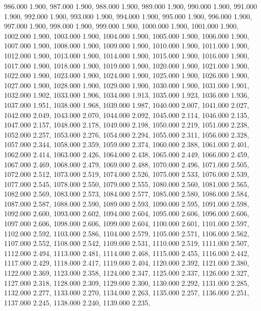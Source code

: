 986.000 1.900, 
987.000 1.900, 
988.000 1.900, 
989.000 1.900, 
990.000 1.900, 
991.000 1.900, 
992.000 1.900, 
993.000 1.900, 
994.000 1.900, 
995.000 1.900, 
996.000 1.900, 
997.000 1.900, 
998.000 1.900, 
999.000 1.900, 
1000.000 1.900, 
1001.000 1.900, 
1002.000 1.900, 
1003.000 1.900, 
1004.000 1.900, 
1005.000 1.900, 
1006.000 1.900, 
1007.000 1.900, 
1008.000 1.900, 
1009.000 1.900, 
1010.000 1.900, 
1011.000 1.900, 
1012.000 1.900, 
1013.000 1.900, 
1014.000 1.900, 
1015.000 1.900, 
1016.000 1.900, 
1017.000 1.900, 
1018.000 1.900, 
1019.000 1.900, 
1020.000 1.900, 
1021.000 1.900, 
1022.000 1.900, 
1023.000 1.900, 
1024.000 1.900, 
1025.000 1.900, 
1026.000 1.900, 
1027.000 1.900, 
1028.000 1.900, 
1029.000 1.900, 
1030.000 1.900, 
1031.000 1.901, 
1032.000 1.902, 
1033.000 1.906, 
1034.000 1.913, 
1035.000 1.923, 
1036.000 1.936, 
1037.000 1.951, 
1038.000 1.968, 
1039.000 1.987, 
1040.000 2.007, 
1041.000 2.027, 
1042.000 2.049, 
1043.000 2.070, 
1044.000 2.092, 
1045.000 2.114, 
1046.000 2.135, 
1047.000 2.157, 
1048.000 2.178, 
1049.000 2.198, 
1050.000 2.219, 
1051.000 2.238, 
1052.000 2.257, 
1053.000 2.276, 
1054.000 2.294, 
1055.000 2.311, 
1056.000 2.328, 
1057.000 2.344, 
1058.000 2.359, 
1059.000 2.374, 
1060.000 2.388, 
1061.000 2.401, 
1062.000 2.414, 
1063.000 2.426, 
1064.000 2.438, 
1065.000 2.449, 
1066.000 2.459, 
1067.000 2.469, 
1068.000 2.479, 
1069.000 2.488, 
1070.000 2.496, 
1071.000 2.505, 
1072.000 2.512, 
1073.000 2.519, 
1074.000 2.526, 
1075.000 2.533, 
1076.000 2.539, 
1077.000 2.545, 
1078.000 2.550, 
1079.000 2.555, 
1080.000 2.560, 
1081.000 2.565, 
1082.000 2.569, 
1083.000 2.573, 
1084.000 2.577, 
1085.000 2.580, 
1086.000 2.584, 
1087.000 2.587, 
1088.000 2.590, 
1089.000 2.593, 
1090.000 2.595, 
1091.000 2.598, 
1092.000 2.600, 
1093.000 2.602, 
1094.000 2.604, 
1095.000 2.606, 
1096.000 2.606, 
1097.000 2.606, 
1098.000 2.606, 
1099.000 2.604, 
1100.000 2.601, 
1101.000 2.597, 
1102.000 2.592, 
1103.000 2.586, 
1104.000 2.579, 
1105.000 2.571, 
1106.000 2.562, 
1107.000 2.552, 
1108.000 2.542, 
1109.000 2.531, 
1110.000 2.519, 
1111.000 2.507, 
1112.000 2.494, 
1113.000 2.481, 
1114.000 2.468, 
1115.000 2.455, 
1116.000 2.442, 
1117.000 2.429, 
1118.000 2.417, 
1119.000 2.404, 
1120.000 2.392, 
1121.000 2.380, 
1122.000 2.369, 
1123.000 2.358, 
1124.000 2.347, 
1125.000 2.337, 
1126.000 2.327, 
1127.000 2.318, 
1128.000 2.309, 
1129.000 2.300, 
1130.000 2.292, 
1131.000 2.285, 
1132.000 2.277, 
1133.000 2.270, 
1134.000 2.263, 
1135.000 2.257, 
1136.000 2.251, 
1137.000 2.245, 
1138.000 2.240, 
1139.000 2.235, 
